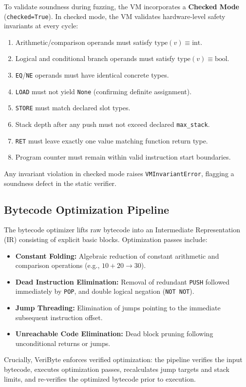 \documentclass[conference]{IEEEtran}
\begin{document}
To validate soundness during fuzzing, the VM incorporates a \textbf{Checked Mode} (\texttt{checked=True}). In checked mode, the VM validates hardware-level safety invariants at every cycle:
\begin{enumerate}
    \item Arithmetic/comparison operands must satisfy $\text{type}(v) \equiv \text{int}$.
    \item Logical and conditional branch operands must satisfy $\text{type}(v) \equiv \text{bool}$.
    \item \texttt{EQ}/\texttt{NE} operands must have identical concrete types.
    \item \texttt{LOAD} must not yield \texttt{None} (confirming definite assignment).
    \item \texttt{STORE} must match declared slot types.
    \item Stack depth after any push must not exceed declared \texttt{max\_stack}.
    \item \texttt{RET} must leave exactly one value matching function return type.
    \item Program counter must remain within valid instruction start boundaries.
\end{enumerate}
Any invariant violation in checked mode raises \texttt{VMInvariantError}, flagging a soundness defect in the static verifier.

\subsection{Bytecode Optimization Pipeline}
The bytecode optimizer lifts raw bytecode into an Intermediate Representation (IR) consisting of explicit basic blocks. Optimization passes include:
\begin{itemize}
    \item \textbf{Constant Folding:} Algebraic reduction of constant arithmetic and comparison operations (e.g., $10 + 20 \to 30$).
    \item \textbf{Dead Instruction Elimination:} Removal of redundant \texttt{PUSH} followed immediately by \texttt{POP}, and double logical negation (\texttt{NOT NOT}).
    \item \textbf{Jump Threading:} Elimination of jumps pointing to the immediate subsequent instruction offset.
    \item \textbf{Unreachable Code Elimination:} Dead block pruning following unconditional returns or jumps.
\end{itemize}
Crucially, VeriByte enforces verified optimization: the pipeline verifies the input bytecode, executes optimization passes, recalculates jump targets and stack limits, and re-verifies the optimized bytecode prior to execution.
\end{document}
